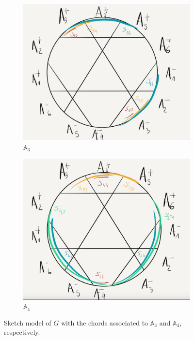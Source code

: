 \documentclass[a4paper,10pt]{report}
\theoremstyle{plain}
\theoremstyle{remark}
\theoremstyle{plain}
\begin{document}
{\begin{figure}[h!]
  \begin{subfigure}[b]{0.5\textwidth}
    \includegraphics[width=\textwidth]{modelA3.png}
    \caption{$\mathbb{A}_3$}
    \label{fig:modelA3}
  \end{subfigure}
  \hfill
  \begin{subfigure}[b]{0.48\textwidth}
    \includegraphics[width=\textwidth]{modelA4.png}
    \caption{$\mathbb{A}_4$}    
    \label{fig:f2}
  \end{subfigure}
  \caption{Sketch model of $G$ with the chords associated to $\mathbb{A}_3$ and $\mathbb{A}_4$, respectively.}
\end{figure}

}
\end{document}
